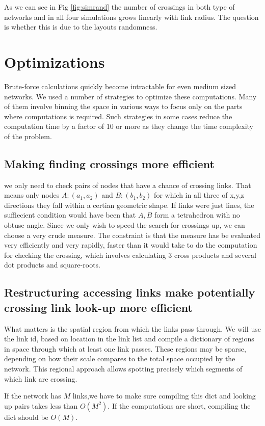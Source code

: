 \documentclass[nofootinbib,preprint,floatfix,titlepage,superscriptaddress]{revtex4} %
\begin{document}
As we can see in Fig \ref{fig:simrand} the number of crossings in both type of networks and in all four simulations grows linearly with link radius. The question is whether this is due to the layouts randomness. 

\section{Optimizations}
Brute-force calculations quickly become intractable for even medium sized networks. We used a number of strategies to optimize these computations. Many of them involve binning the space in various ways to focus only on the parts where computations is required. Such strategies in some cases reduce the computation time by a factor of 10 or more as they change the time complexity of the problem. 

\subsection{Making finding crossings more efficient}
we only need to check pairs of nodes that have a chance of crossing links. That means only nodes $A:(a_1,a_2)$ and $B:(b_1,b_2)$ for which in all three of x,y,z directions they fall within a certian geometric shape. If links were just lines, the suffiecient condition would have been that $A,B$ form a tetrahedron with no obtuse angle. Since we only wish to speed the search for crossings up, we can choose a very crude measure. The constraint is that the measure has be evaluated very efficiently and very rapidly, faster than it would take to do the computation for checking the crossing, which involves calculating 3 cross products and several dot products and square-roots. 
\subsection{ Restructuring accessing links make potentially crossing link look-up more efficient}

What matters is the spatial region from which the links pass through. We will use the link id, based on location in the link list and compile a dictionary of regions in space through which at least one link passes. These regions may be sparse, depending on how their scale compares to the total space occupied by the network. This regional approach allows spotting precisely which segments of which link are crossing. 


If the network has $M$ links,we have to make sure compiling this dict and looking up pairs takes less than $O(M^2)$. If the computations are short, compiling the dict should be $O(M)$. 
\end{document}
